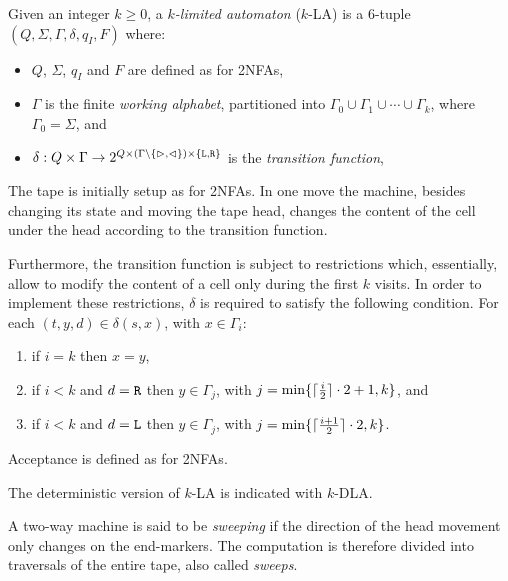 \begin{defn}\label{def:kla}
	Given an integer $k\ge0$, a \emph{$k$-limited automaton} ($k$-LA) is a 6-tuple $(Q,\Sigma,\Gamma,\delta,q_I,F)$ where:
	\begin{itemize}
		\item $Q$, $\Sigma$, $q_I$ and $F$ are defined as for 2NFAs,
		\item $\Gamma$ is the finite \emph{working alphabet}, partitioned into $\Gamma_0\cup\Gamma_1\cup\cdots\cup\Gamma_k$, where $\Gamma_0=\Sigma$, and
		\item $\delta:Q\times\Gamma\to2^{Q\times(\Gamma\setminus\{\rhd,\lhd\})\times\{\mathtt L,\mathtt R\}}$ is the \emph{transition function},
	\end{itemize}
	The tape is initially setup as for 2NFAs.
	In one move the machine, besides changing its state and moving the tape head, changes the content of the cell under the head according to the transition function.

	Furthermore, the transition function is subject to restrictions which, essentially, allow to modify the content of a cell only during the first $k$ visits.
	In order to implement these restrictions, $\delta$ is required to satisfy the following condition. For each $(t,y,d)\in\delta(s,x)$, with $x\in\Gamma_i$:
	\begin{enumerate}[(1)]
		\item if $i=k$ then $x=y$,
		\item if $i<k$ and $d=\mathtt R$ then $y\in\Gamma_j$, with $j=\min\{\lceil \frac{i}{2} \rceil\cdot 2+1,k\}$, and
		\item if $i<k$ and $d=\mathtt L$ then $y\in\Gamma_j$, with $j=\min\{\lceil \frac{i+1}{2} \rceil\cdot 2,k\}$.
	\end{enumerate}

	\noindent Acceptance is defined as for 2NFAs.

	\noindent The deterministic version of $k$-LA is indicated with $k$-DLA.
\end{defn}



\begin{defn}\label{def:sweeping}
	A two-way machine is said to be \emph{sweeping} if the direction of the head movement only changes on the end-markers.
	The computation is therefore divided into traversals of the entire tape, also called \emph{sweeps}.
\end{defn}
